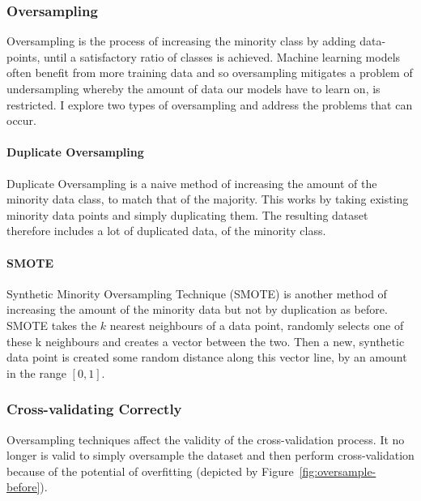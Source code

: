 \documentclass[12pt,a4paper,twoside]{report}
\begin{document}
\subsubsection{Oversampling}
Oversampling is the process of increasing the minority class by adding data-points, until a satisfactory ratio of classes is achieved. Machine learning models often benefit from more training data and so oversampling mitigates a problem of undersampling whereby the amount of data our models have to learn on, is restricted. 
I explore two types of oversampling and address the problems that can occur.

\paragraph{Duplicate Oversampling} 
Duplicate Oversampling is a naive method of increasing the amount of the minority data class, to match that of the majority. This works by taking existing minority data points and simply duplicating them. The resulting dataset therefore includes a lot of duplicated data, of the minority class.

\paragraph{SMOTE} 
Synthetic Minority Oversampling Technique (SMOTE) is another method of increasing the amount of the minority data but not by duplication as before. SMOTE takes the $k$ nearest neighbours of a data point, randomly selects one of these k neighbours and creates a vector between the two. Then a new, synthetic data point is created some random distance along this vector line, by an amount in the range $[0,1]$.

\subsubsection{Cross-validating Correctly}
Oversampling techniques affect the validity of the cross-validation process. It no longer is valid to simply oversample the dataset and then perform cross-validation because of the potential of overfitting (depicted by Figure~\ref{fig:oversample-before}).
\end{document}
